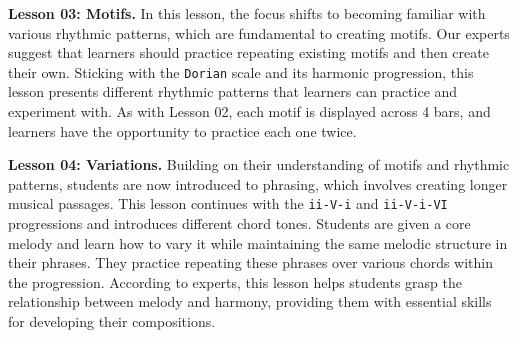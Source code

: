 \documentclass{vgtc}                          %
\begin{document}
\par %
\textbf{Lesson 03: Motifs.} In this lesson, the focus shifts to becoming familiar with various rhythmic patterns, which are fundamental to creating motifs. Our experts suggest that learners should practice repeating existing motifs and then create their own. Sticking with the \texttt{Dorian} scale and its harmonic progression, this lesson presents different rhythmic patterns that learners can practice and experiment with. As with Lesson 02, each motif is displayed across 4 bars, and learners have the opportunity to practice each one twice.

\par %
\textbf{Lesson 04: Variations.} Building on their understanding of motifs and rhythmic patterns, students are now introduced to phrasing, which involves creating longer musical passages. This lesson continues with the \texttt{ii-V-i} and \texttt{ii-V-i-VI} progressions and introduces different chord tones. Students are given a core melody and learn how to vary it while maintaining the same melodic structure in their phrases. They practice repeating these phrases over various chords within the progression. According to experts, this lesson helps students grasp the relationship between melody and harmony, providing them with essential skills for developing their compositions.
\end{document}
